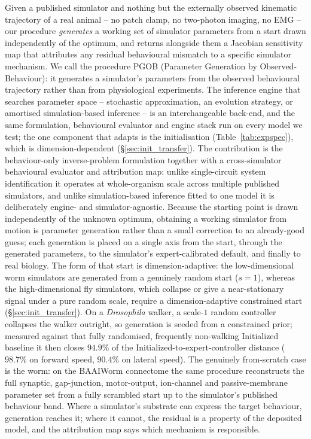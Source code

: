 \documentclass[11pt]{article}
\begin{document}
Given a published simulator and nothing but the externally observed kinematic trajectory of a real animal -- no patch clamp, no two-photon imaging, no EMG -- our procedure \emph{generates} a working set of simulator parameters from a start drawn independently of the optimum, and returns alongside them a Jacobian sensitivity map that attributes any residual behavioural mismatch to a specific simulator mechanism. We call the procedure PGOB (Parameter Generation by Observed-Behaviour): it generates a simulator's parameters from the observed behavioural trajectory rather than from physiological experiments. The inference engine that searches parameter space -- stochastic approximation, an evolution strategy, or amortised simulation-based inference \citep{cranmer2020frontier} -- is an interchangeable back-end, and the same formulation, behavioural evaluator and engine stack run on every model we test; the one component that adapts is the initialisation (Table~\ref{tab:expspec}), which is dimension-dependent (\S\ref{sec:init_transfer}). The contribution is the behaviour-only inverse-problem formulation together with a cross-simulator behavioural evaluator and attribution map: unlike single-circuit system identification \citep{izquierdo2013connecting} it operates at whole-organism scale across multiple published simulators, and unlike simulation-based inference fitted to one model it is deliberately engine- and simulator-agnostic. Because the starting point is drawn independently of the unknown optimum, obtaining a working simulator from motion is parameter generation rather than a small correction to an already-good guess; each generation is placed on a single axis from the start, through the generated parameters, to the simulator's expert-calibrated default, and finally to real biology. The form of that start is dimension-adaptive: the low-dimensional worm simulators are generated from a genuinely random start ($s{=}1$), whereas the high-dimensional fly simulators, which collapse or give a near-stationary signal under a pure random scale, require a dimension-adaptive constrained start (\S\ref{sec:init_transfer}). On a \emph{Drosophila} walker, a scale-$1$ random controller collapses the walker outright, so generation is seeded from a constrained prior; measured against that fully randomised, frequently non-walking Initialized baseline it then closes $94.9\%$ of the Initialized-to-expert-controller distance ($98.7\%$ on forward speed, $90.4\%$ on lateral speed). The genuinely from-scratch case is the worm: on the BAAIWorm connectome the same procedure reconstructs the full synaptic, gap-junction, motor-output, ion-channel and passive-membrane parameter set from a fully scrambled start up to the simulator's published behaviour band. Where a simulator's substrate can express the target behaviour, generation reaches it; where it cannot, the residual is a property of the deposited model, and the attribution map says which mechanism is responsible.
\end{document}
